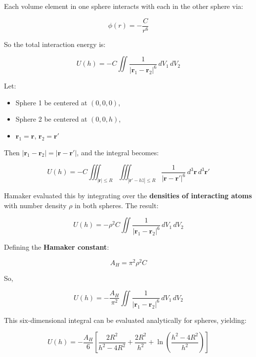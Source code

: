 \documentclass[
  letterpaper,
  enabledeprecatedfontcommands]{report}
\providecommand{\tightlist}{%
  \setlength{\itemsep}{0pt}\setlength{\parskip}{0pt}}
\begin{document}
\begin{tcolorbox}[enhanced jigsaw, leftrule=.75mm, bottomrule=.15mm, toprule=.15mm, colbacktitle=quarto-callout-note-color!10!white, title=\textcolor{quarto-callout-note-color}{\faInfo}\hspace{0.5em}{Sketch of a derivation of colloid-colloid Van der Waals potential}, breakable, titlerule=0mm, opacitybacktitle=0.6, colback=white, coltitle=black, colframe=quarto-callout-note-color-frame, bottomtitle=1mm, rightrule=.15mm, toptitle=1mm, left=2mm, opacityback=0, arc=.35mm]

Each volume element in one sphere interacts with each in the other
sphere via:

\[
\phi(r) = -\frac{C}{r^6}
\]

So the total interaction energy is:

\[
U(h) = -C \iint \frac{1}{|\mathbf{r}_1 - \mathbf{r}_2|^6} \, dV_1 \, dV_2
\]

Let:

\begin{itemize}
\tightlist
\item
  Sphere 1 be centered at \((0, 0, 0)\),
\item
  Sphere 2 be centered at \((0, 0, h)\),
\item
  \(\mathbf{r}_1 = \mathbf{r}\), \(\mathbf{r}_2 = \mathbf{r}'\)
\end{itemize}

Then \(|\mathbf{r}_1 - \mathbf{r}_2| = |\mathbf{r} - \mathbf{r}'|\), and
the integral becomes:

\[
U(h) = -C \iiint_{|\mathbf{r}| \leq R} \iiint_{|\mathbf{r}' - h\hat{z}| \leq R} \frac{1}{|\mathbf{r} - \mathbf{r}'|^6} \, d^3\mathbf{r} \, d^3\mathbf{r}'
\]

Hamaker evaluated this by integrating over the \textbf{densities of
interacting atoms} with number density \(\rho\) in both spheres. The
result:

\[
U(h) = -\rho^2 C \iint \frac{1}{|\mathbf{r}_1 - \mathbf{r}_2|^6} \, dV_1 \, dV_2
\]

Defining the \textbf{Hamaker constant}:

\[
A_H = \pi^2 \rho^2 C
\]

So,

\[
U(h) = -\frac{A_H}{\pi^2} \iint \frac{1}{|\mathbf{r}_1 - \mathbf{r}_2|^6} \, dV_1 \, dV_2
\]

This six-dimensional integral can be evaluated analytically for spheres,
yielding:

\[
U(h) = -\frac{A_H}{6} \left[ \frac{2R^2}{h^2 - 4R^2} + \frac{2R^2}{h^2} + \ln\left( \frac{h^2 - 4R^2}{h^2} \right) \right]
\]

\end{tcolorbox}
\end{document}
